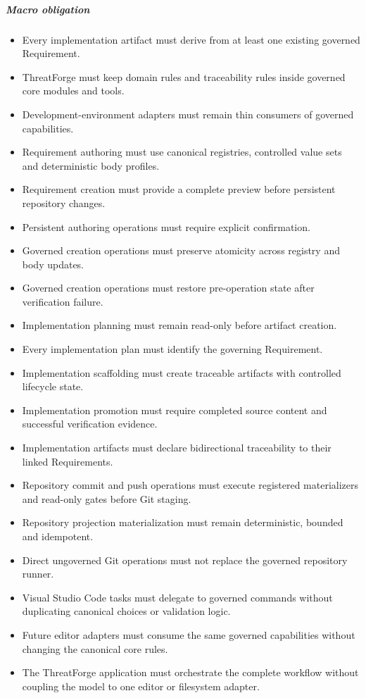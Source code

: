 \documentclass[
  10pt,
]{article}
\providecommand{\tightlist}{%
  \setlength{\itemsep}{0pt}\setlength{\parskip}{0pt}}
\begin{document}
\subparagraph{Macro obligation}\label{macro-obligation-1}

\begin{itemize}
\tightlist
\item
  Every implementation artifact must derive from at least one existing
  governed Requirement.
\item
  ThreatForge must keep domain rules and traceability rules inside
  governed core modules and tools.
\item
  Development-environment adapters must remain thin consumers of
  governed capabilities.
\item
  Requirement authoring must use canonical registries, controlled value
  sets and deterministic body profiles.
\item
  Requirement creation must provide a complete preview before persistent
  repository changes.
\item
  Persistent authoring operations must require explicit confirmation.
\item
  Governed creation operations must preserve atomicity across registry
  and body updates.
\item
  Governed creation operations must restore pre-operation state after
  verification failure.
\item
  Implementation planning must remain read-only before artifact
  creation.
\item
  Every implementation plan must identify the governing Requirement.
\item
  Implementation scaffolding must create traceable artifacts with
  controlled lifecycle state.
\item
  Implementation promotion must require completed source content and
  successful verification evidence.
\item
  Implementation artifacts must declare bidirectional traceability to
  their linked Requirements.
\item
  Repository commit and push operations must execute registered
  materializers and read-only gates before Git staging.
\item
  Repository projection materialization must remain deterministic,
  bounded and idempotent.
\item
  Direct ungoverned Git operations must not replace the governed
  repository runner.
\item
  Visual Studio Code tasks must delegate to governed commands without
  duplicating canonical choices or validation logic.
\item
  Future editor adapters must consume the same governed capabilities
  without changing the canonical core rules.
\item
  The ThreatForge application must orchestrate the complete workflow
  without coupling the model to one editor or filesystem adapter.
\end{itemize}
\end{document}
